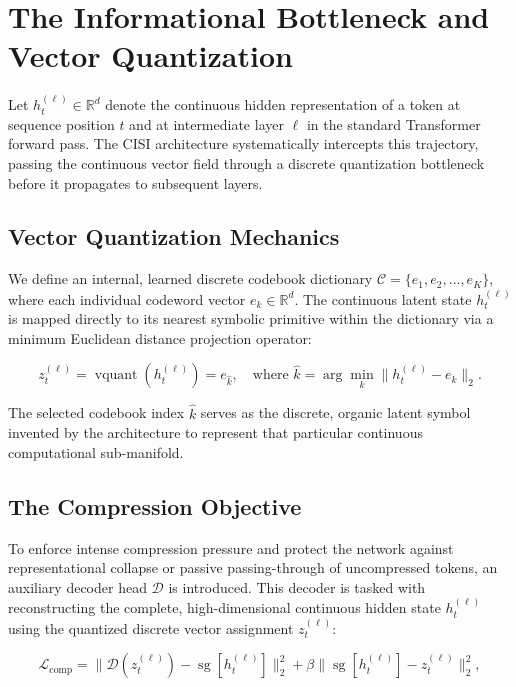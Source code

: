 \chapter{The Informational Bottleneck and Vector Quantization}

Let $h_t^{(\ell)} \in \mathbb{R}^{d}$ denote the continuous hidden representation of a token at sequence position $t$ and at intermediate layer $\ell$ in the standard Transformer forward pass. The CISI architecture systematically intercepts this trajectory, passing the continuous vector field through a discrete quantization bottleneck before it propagates to subsequent layers.

\section{Vector Quantization Mechanics}
We define an internal, learned discrete codebook dictionary $\mathcal{C} = \{e_1, e_2, \dots, e_K\}$, where each individual codeword vector $e_k \in \mathbb{R}^{d}$. The continuous latent state $h_t^{(\ell)}$ is mapped directly to its nearest symbolic primitive within the dictionary via a minimum Euclidean distance projection operator:

\begin{equation}
z_t^{(\ell)} = \operatorname{vquant}\left(h_t^{(\ell)}\right) = e_{\hat{k}}, \quad \text{where } \hat{k} = \arg\min_{k} \|h_t^{(\ell)} - e_k\|_2.
\end{equation}

The selected codebook index $\hat{k}$ serves as the discrete, organic latent symbol invented by the architecture to represent that particular continuous computational sub-manifold.

\section{The Compression Objective}
To enforce intense compression pressure and protect the network against representational collapse or passive passing-through of uncompressed tokens, an auxiliary decoder head $\mathcal{D}$ is introduced. This decoder is tasked with reconstructing the complete, high-dimensional continuous hidden state $h_t^{(\ell)}$ using the quantized discrete vector assignment $z_t^{(\ell)}$:

\begin{equation}
\mathcal{L}_{\text{comp}} = \| \mathcal{D}\left(z_t^{(\ell)}\right) - \operatorname{sg}[h_t^{(\ell)}] \|_2^2 + \beta \| \operatorname{sg}[h_t^{(\ell)}] - z_t^{(\ell)} \|_2^2,
\end{equation}

